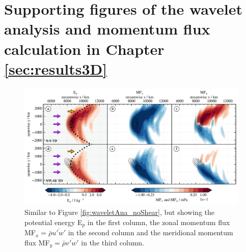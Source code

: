 \chapter{Supporting figures of the wavelet analysis and momentum flux calculation in Chapter \ref{sec:results3D}}
\label{appA}
\thispagestyle{plain}
%
\begin{figure}[t]
    \centering
    \includegraphics[width=0.99\textwidth]{figures_3D/waveletAna_overview_noShear_mf.png}
    \caption{Similar to Figure \ref{fig:waveletAna_noShear}, but showing the potential energy E$_p$ in the first column, the zonal momentum flux MF$_x= \bar{\rho} \overbar{u'w'}$ in the second column and the meridional momentum flux MF$_y= \bar{\rho} \overbar{v'w'}$ in the third column.}
    \label{fig:waveletAna_noShear_mf}
\end{figure}
%
